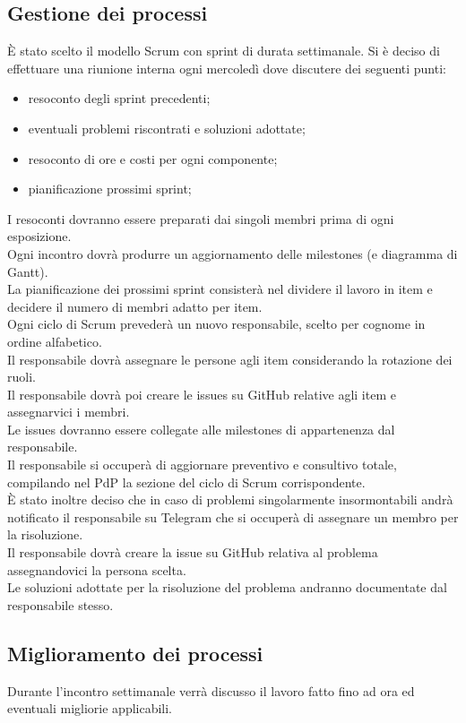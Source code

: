 \documentclass[a4paper, 12pt]{article}
\begin{document}
\subsection{Gestione dei processi}
È stato scelto il modello Scrum con sprint di durata settimanale.
Si è deciso di effettuare una riunione interna ogni mercoledì dove discutere dei seguenti punti:
\begin{itemize}
\item resoconto degli sprint precedenti;
\item eventuali problemi riscontrati e soluzioni adottate;
\item resoconto di ore e costi per ogni componente;
\item pianificazione prossimi sprint;
\end{itemize}
I resoconti dovranno essere preparati dai singoli membri prima di ogni esposizione.\\
Ogni incontro dovrà produrre un aggiornamento delle milestones (e diagramma di Gantt).\\
La pianificazione dei prossimi sprint consisterà nel dividere il lavoro in item e decidere il numero di membri adatto per item.\\
Ogni ciclo di Scrum prevederà un nuovo responsabile, scelto per cognome in ordine alfabetico.\\
Il responsabile dovrà assegnare le persone agli item considerando la rotazione dei ruoli.\\
Il responsabile dovrà poi creare le issues su GitHub relative agli item e assegnarvici i membri.\\
Le issues dovranno essere collegate alle milestones di appartenenza dal responsabile.\\
Il responsabile si occuperà di aggiornare preventivo e consultivo totale, compilando nel PdP la sezione del ciclo di Scrum corrispondente.\\
È stato inoltre deciso che in caso di problemi singolarmente insormontabili andrà notificato il responsabile su Telegram che si occuperà di assegnare
un membro per la risoluzione.\\
Il responsabile dovrà creare la issue su GitHub relativa al problema assegnandovici la persona scelta.\\
Le soluzioni adottate per la risoluzione del problema andranno documentate dal responsabile stesso.\\

\subsection{Miglioramento dei processi}
Durante l'incontro settimanale verrà discusso il lavoro fatto fino ad ora ed eventuali migliorie applicabili.
\end{document}
